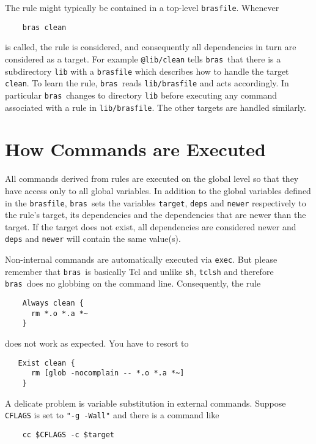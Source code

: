\documentclass[12pt]{article}
\newcommand{\bras}{\texttt{bras}}
\begin{document}
The rule might typically be contained in a top-level
\texttt{brasfile}. Whenever 
\begin{verbatim}
    bras clean
\end{verbatim}
is called, the rule is considered, and consequently all
dependencies in turn are considered as a target. For example
\texttt{@lib/clean} tells \bras\ that there is a subdirectory
\texttt{lib} with a \texttt{brasfile} which
describes how to handle the target \texttt{clean}. To learn
the rule, \bras\ reads \texttt{lib/brasfile} and acts accordingly.
In particular \bras\ changes to directory \texttt{lib}
before executing any command associated with a rule in
\texttt{lib/brasfile}. The other targets are handled similarly.


\section{How Commands are Executed}
\label{secCmdExec}

All commands derived from rules are executed on the global level
so that they have access only to all global variables. In addition
to the global variables defined in the
\texttt{brasfile}, \bras\ sets the variables \texttt{target},
\texttt{deps} and \texttt{newer} respectively to the rule's target, its
dependencies and the dependencies that are newer than the target. If
the target does not exist, all dependencies are considered newer and
\texttt{deps} and \texttt{newer} will contain the same value(s).

Non-internal commands are automatically executed
via \texttt{exec}. But please remember that \bras\ is basically
Tcl and unlike \texttt{sh}, \texttt{tclsh} and therefore \bras\ does no
globbing on the command line. Consequently, the rule
\begin{verbatim}
    Always clean {
      rm *.o *.a *~
    }
\end{verbatim}
does not work as expected. You have to resort to
\begin{verbatim}
   Exist clean {
      rm [glob -nocomplain -- *.o *.a *~]
    }
\end{verbatim}
    
A delicate problem is variable substitution in
external commands. Suppose \texttt{CFLAGS} is set to 
\texttt{"-g -Wall"} and there is a command like 

\begin{verbatim}
    cc $CFLAGS -c $target
\end{verbatim}
\end{document}
